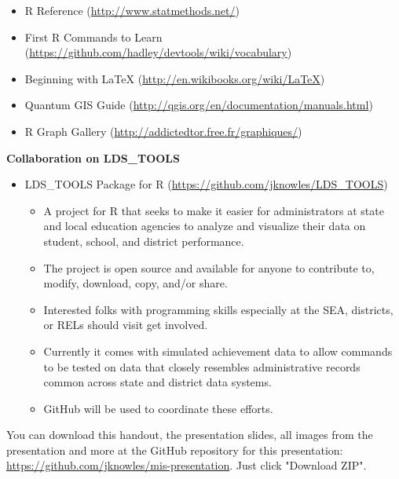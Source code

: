 \documentclass{article}
\begin{document}
\begin{itemize}
  \item R Reference (\href{http://www.statmethods.net/}{http://www.statmethods.net/})
  \item First R Commands to Learn (\href{https://github.com/hadley/devtools/wiki/vocabulary}{https://github.com/hadley/devtools/wiki/vocabulary})
  \item Beginning with \LaTeX{} (\href{http://en.wikibooks.org/wiki/LaTeX}{http://en.wikibooks.org/wiki/LaTeX})
  \item Quantum GIS Guide (\href{http://qgis.org/en/documentation/manuals.html}{http://qgis.org/en/documentation/manuals.html})
  \item R Graph Gallery (\href{http://addictedtor.free.fr/graphiques/}{http://addictedtor.free.fr/graphiques/})

\end{itemize}

\vspace{.15in}

\textbf{Collaboration on LDS\_TOOLS}

\begin{itemize}
  \item \textsc{LDS\_TOOLS} Package for R (\href{https://github.com/jknowles/LDS_TOOLS}{https://github.com/jknowles/LDS\_TOOLS})
    \begin{itemize}
    \item  A project for R that seeks to make it easier for administrators at state and local education agencies to analyze and visualize their data on student, school, and district performance.
    \item  The project is open source and available for anyone to contribute to, modify, download, copy, and/or share. 
    \item  Interested folks with programming skills especially at the \textsc{SEA}, districts, or \textsc{REL}s should visit get involved.
    \item  Currently it comes with simulated achievement data to allow commands to be tested on data that closely resembles administrative records common across state and district data systems.
    \item GitHub will be used to coordinate these efforts. 
    \end{itemize}

\end{itemize}

\noindent You can download this handout, the presentation slides, all images from the presentation and more at the GitHub repository for this presentation: \href{https://github.com/jknowles/mis-presentation}{https://github.com/jknowles/mis-presentation}. Just click "Download ZIP".
\vspace{.2in}
\end{document}
